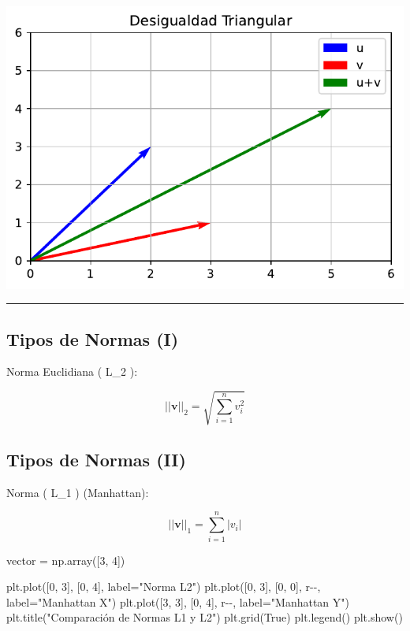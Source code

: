 \documentclass[
  letterpaper,
  DIV=11,
  numbers=noendperiod]{scrartcl}
\newenvironment{Shaded}{\begin{snugshade}}{\end{snugshade}}
\newcommand{\DecValTok}[1]{\textcolor[rgb]{0.68,0.00,0.00}{#1}}
\newcommand{\NormalTok}[1]{\textcolor[rgb]{0.00,0.23,0.31}{#1}}
\newcommand{\OperatorTok}[1]{\textcolor[rgb]{0.37,0.37,0.37}{#1}}
\newcommand{\StringTok}[1]{\textcolor[rgb]{0.13,0.47,0.30}{#1}}
\newcommand{\VariableTok}[1]{\textcolor[rgb]{0.07,0.07,0.07}{#1}}
\begin{document}
\includegraphics{presentacion_files/figure-pdf/cell-3-output-1.pdf}

\begin{center}\rule{0.5\linewidth}{0.5pt}\end{center}

\subsection{Tipos de Normas (I)}\label{tipos-de-normas-i}

Norma Euclidiana ( L\_2 ):

\[
||\mathbf{v}||_2 = \sqrt{\sum_{i=1}^n v_i^2}
\]

\subsection{Tipos de Normas (II)}\label{tipos-de-normas-ii}

Norma ( L\_1 ) (Manhattan):

\[
||\mathbf{v}||_1 = \sum_{i=1}^n |v_i|
\]

\begin{Shaded}
\begin{Highlighting}[]
\NormalTok{vector }\OperatorTok{=}\NormalTok{ np.array([}\DecValTok{3}\NormalTok{, }\DecValTok{4}\NormalTok{])}

\NormalTok{plt.plot([}\DecValTok{0}\NormalTok{, }\DecValTok{3}\NormalTok{], [}\DecValTok{0}\NormalTok{, }\DecValTok{4}\NormalTok{], label}\OperatorTok{=}\StringTok{"Norma L2"}\NormalTok{)}
\NormalTok{plt.plot([}\DecValTok{0}\NormalTok{, }\DecValTok{3}\NormalTok{], [}\DecValTok{0}\NormalTok{, }\DecValTok{0}\NormalTok{], }\StringTok{\textquotesingle{}r{-}{-}\textquotesingle{}}\NormalTok{, label}\OperatorTok{=}\StringTok{"Manhattan X"}\NormalTok{)}
\NormalTok{plt.plot([}\DecValTok{3}\NormalTok{, }\DecValTok{3}\NormalTok{], [}\DecValTok{0}\NormalTok{, }\DecValTok{4}\NormalTok{], }\StringTok{\textquotesingle{}r{-}{-}\textquotesingle{}}\NormalTok{, label}\OperatorTok{=}\StringTok{"Manhattan Y"}\NormalTok{)}
\NormalTok{plt.title(}\StringTok{"Comparación de Normas L1 y L2"}\NormalTok{)}
\NormalTok{plt.grid(}\VariableTok{True}\NormalTok{)}
\NormalTok{plt.legend()}
\NormalTok{plt.show()}
\end{Highlighting}
\end{Shaded}
\end{document}
